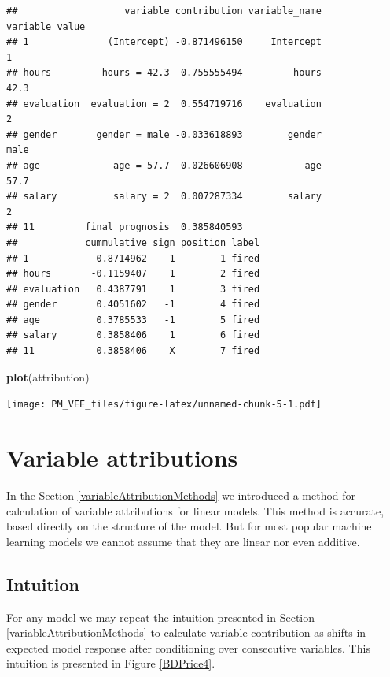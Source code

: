 \documentclass[]{krantz}
\newenvironment{Shaded}{\begin{snugshade}}{\end{snugshade}}
\newcommand{\KeywordTok}[1]{\textcolor[rgb]{0.13,0.29,0.53}{\textbf{#1}}}
\newcommand{\NormalTok}[1]{#1}
\theoremstyle{definition}
\theoremstyle{definition}
\theoremstyle{definition}
\theoremstyle{remark}
\begin{document}
\begin{verbatim}
##                   variable contribution variable_name variable_value
## 1              (Intercept) -0.871496150     Intercept              1
## hours         hours = 42.3  0.755555494         hours           42.3
## evaluation  evaluation = 2  0.554719716    evaluation              2
## gender       gender = male -0.033618893        gender           male
## age             age = 57.7 -0.026606908           age           57.7
## salary          salary = 2  0.007287334        salary              2
## 11         final_prognosis  0.385840593                             
##            cummulative sign position label
## 1           -0.8714962   -1        1 fired
## hours       -0.1159407    1        2 fired
## evaluation   0.4387791    1        3 fired
## gender       0.4051602   -1        4 fired
## age          0.3785533   -1        5 fired
## salary       0.3858406    1        6 fired
## 11           0.3858406    X        7 fired
\end{verbatim}

\begin{Shaded}
\begin{Highlighting}[]
\KeywordTok{plot}\NormalTok{(attribution)}
\end{Highlighting}
\end{Shaded}

\texttt{[image: PM\_VEE\_files/figure-latex/unnamed-chunk-5-1.pdf]}

\hypertarget{breakDown}{%
\section{Variable attributions}\label{breakDown}}

In the Section \ref{variableAttributionMethods} we introduced a method
for calculation of variable attributions for linear models. This method
is accurate, based directly on the structure of the model. But for most
popular machine learning models we cannot assume that they are linear
nor even additive.

\hypertarget{intuition-1}{%
\subsection{Intuition}\label{intuition-1}}

For any model we may repeat the intuition presented in Section
\ref{variableAttributionMethods} to calculate variable contribution as
shifts in expected model response after conditioning over consecutive
variables. This intuition is presented in Figure \ref{BDPrice4}.
\end{document}
